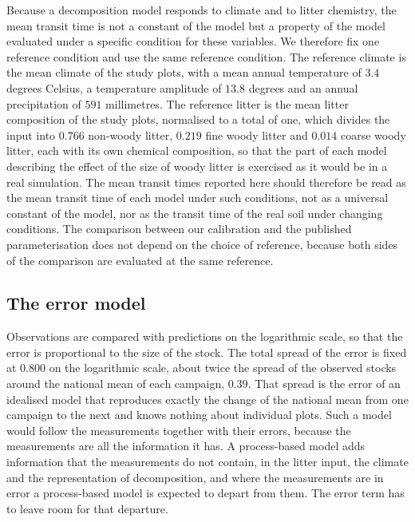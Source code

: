 \documentclass[11pt]{article}
\begin{document}
Because a decomposition model responds to climate and to litter chemistry, the mean
transit time is not a constant of the model but a property of the model evaluated
under a specific condition for these variables. We therefore fix one reference condition and use the same
reference condition. The reference climate is the mean climate of the study plots, with a mean
annual temperature of $3.4$ degrees Celsius, a temperature amplitude of $13.8$ degrees
and an annual precipitation of $591$ millimetres. The reference litter is the mean
litter composition of the study plots, normalised to a total of one, which divides the
input into $0.766$ non-woody litter, $0.219$ fine woody litter and $0.014$ coarse
woody litter, each with its own chemical composition, so that the part of each model
describing the effect of the size of woody litter is exercised as it would be in a real
simulation. The mean transit times reported here should
therefore be read as the mean transit time of each model under such conditions, not as a universal constant of the model, nor as the transit time of the real soil under changing conditions. The comparison between our calibration and the
published parameterisation does not depend on the choice of reference, because both
sides of the comparison are evaluated at the same reference.

\subsection{The error model}

Observations are compared with predictions on the logarithmic scale, so that the error
is proportional to the size of the stock. The total spread of the error is fixed at
$0.800$ on the logarithmic scale, about twice the spread of the observed stocks around
the national mean of each campaign, $0.39$. That spread is the error of an idealised
model that reproduces exactly the change of the national mean from one campaign to the
next and knows nothing about individual plots. Such a model would follow the
measurements together with their errors, because the measurements are all the
information it has. A process-based model adds information that the measurements do
not contain, in the litter input, the climate and the representation of decomposition,
and where the measurements are in error a process-based model is expected to depart
from them. The error term has to leave room for that departure.
\end{document}
